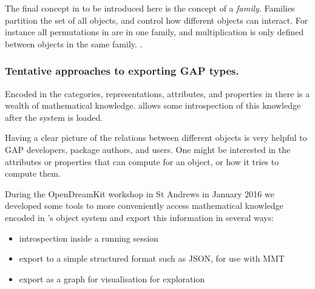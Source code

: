 The final concept in \GAP to be introduced here is the concept of a \emph{family}.
Families partition the set of all objects, and control how different objects can
interact. For instance all permutations in \GAP are in one family, and multiplication
is only defined between objects in the same family.
.




\subsubsection{Tentative approaches to exporting GAP types.}\label{gap-types-export}

Encoded in the categories, representations, attributes, and properties in \GAP
there is a wealth of mathematical knowledge. \GAP allows some introspection
of this knowledge after the system is loaded.

Having a clear picture of the relations between different objects is 
very helpful to GAP developers, package authors, and users. One might 
be interested in the attributes or properties that \GAP can compute for
an object, or how it tries to compute them.

During the OpenDreamKit workshop in St Andrews in January 2016 we developed some
tools to more conveniently access mathematical knowledge encoded in \GAP's object
system and export this information in several ways:
\begin{itemize}
\item introspection inside a running \GAP session
\item export to a simple structured format such as JSON, for use with MMT
\item export as a graph for visualisation for exploration
\end{itemize}

